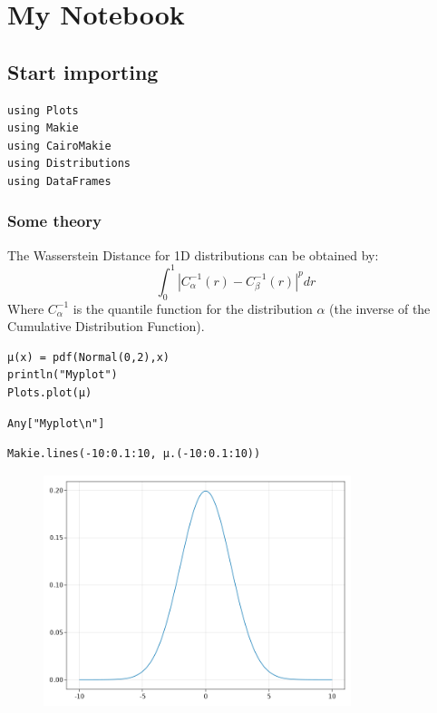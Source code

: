 \newpage

\chapter{My Notebook}

\section{Start importing}

\begin{lstlisting}[language=JuliaLocal, style=julia]
using Plots
using Makie
using CairoMakie
using Distributions
using DataFrames
\end{lstlisting}

\subsection{Some theory}
The Wasserstein Distance for 1D distributions can be obtained by:  $$ \int_0^1 |C_\alpha^{-1}(r) - C_\beta^{-1}(r)|^p dr  $$  Where  $C_\alpha^{-1}$ is the quantile function for the distribution  $\alpha$ (the inverse of the Cumulative Distribution Function).
\begin{lstlisting}[language=JuliaLocal, style=julia]
μ(x) = pdf(Normal(0,2),x)
println("Myplot")
Plots.plot(μ)
\end{lstlisting}

\begin{verbatim}
Any["Myplot\n"]
\end{verbatim}



\begin{lstlisting}[language=JuliaLocal, style=julia]
Makie.lines(-10:0.1:10, μ.(-10:0.1:10))
\end{lstlisting}

\begin{figure}[H]
	\centering
	\includegraphics[width=0.8\textwidth]{./figures/jupyternotebook_figure2.png}
	\label{fig:jupyternotebook_figure2.png}

\end{figure}

